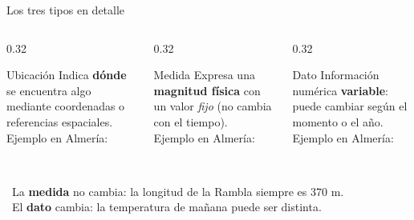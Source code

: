 \documentclass[aspectratio=169, 10pt, spanish]{beamer}
\begin{document}
\begin{frame}{Los tres tipos en detalle}
  \begin{columns}[T]
    \begin{column}{0.32\textwidth}
      \begin{definicionbox}{Ubicación}
        \AlmFontFootnote
        Indica \textbf{dónde} se encuentra algo
        mediante coordenadas o referencias espaciales.\\[4pt]
        Ejemplo en Almería:\\
      \end{definicionbox}
    \end{column}
    \begin{column}{0.32\textwidth}
      \begin{definicionbox}{Medida}
        \AlmFontFootnote
        Expresa una \textbf{magnitud física} con un valor
        \emph{fijo} (no cambia con el tiempo).\\[4pt]
        Ejemplo en Almería:\\
        \\
      \end{definicionbox}
    \end{column}
    \begin{column}{0.32\textwidth}
      \begin{definicionbox}{Dato}
        \AlmFontFootnote
        Información numérica \textbf{variable}: puede
        cambiar según el momento o el año.\\[4pt]
        Ejemplo en Almería:\\
        \\
      \end{definicionbox}
    \end{column}
  \end{columns}
  \vspace{8pt}
  \begin{notabox}
    \AlmFontSmall
    \correcto\ La \textbf{medida} no cambia: la longitud de la Rambla
    siempre es 370 m.\\
    \correcto\ El \textbf{dato} cambia: la temperatura de mañana puede ser distinta.
  \end{notabox}
\end{frame}
\end{document}
